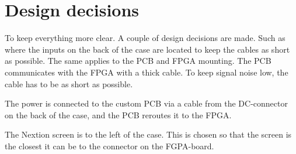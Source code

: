 \section{Design decisions}
To keep everything more clear. A couple of design decisions are made. Such as where the inputs on the back of the case are located to keep the cables as short as possible. The same applies to the PCB and FPGA mounting. The PCB communicates with the FPGA with a thick cable. To keep signal noise low, the cable has to be as short as possible. 
\par
\noindent The power is connected to the custom PCB via a cable from the DC-connector on the back of the case, and the PCB reroutes it to the FPGA.
\par
\noindent The Nextion screen is to the left of the case. This is chosen so that the screen is the closest it can be to the connector on the FGPA-board. 

